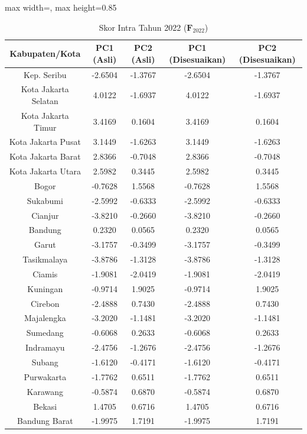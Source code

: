 \begin{table}[H]
\centering
\caption{Skor Intra Tahun 2022 ($\mathbf{F}_{2022}$)} \label{tab:appskor_intra_2022}
\begin{adjustbox}{max width=\textwidth, max height=0.85\textheight}
\begin{tabular}{|c|c|c|c|c|}
\hline
\textbf{Kabupaten/Kota} & \textbf{PC1 (Asli)} & \textbf{PC2 (Asli)} & \textbf{PC1 (Disesuaikan)} & \textbf{PC2 (Disesuaikan)} \\
\hline
Kep. Seribu & -2.6504 & -1.3767 & -2.6504 & -1.3767 \\
Kota Jakarta Selatan & 4.0122 & -1.6937 & 4.0122 & -1.6937 \\
Kota Jakarta Timur & 3.4169 & 0.1604 & 3.4169 & 0.1604 \\
Kota Jakarta Pusat & 3.1449 & -1.6263 & 3.1449 & -1.6263 \\
Kota Jakarta Barat & 2.8366 & -0.7048 & 2.8366 & -0.7048 \\
Kota Jakarta Utara & 2.5982 & 0.3445 & 2.5982 & 0.3445 \\
Bogor & -0.7628 & 1.5568 & -0.7628 & 1.5568 \\
Sukabumi & -2.5992 & -0.6333 & -2.5992 & -0.6333 \\
Cianjur & -3.8210 & -0.2660 & -3.8210 & -0.2660 \\
Bandung & 0.2320 & 0.0565 & 0.2320 & 0.0565 \\
Garut & -3.1757 & -0.3499 & -3.1757 & -0.3499 \\
Tasikmalaya & -3.8786 & -1.3128 & -3.8786 & -1.3128 \\
Ciamis & -1.9081 & -2.0419 & -1.9081 & -2.0419 \\
Kuningan & -0.9714 & 1.9025 & -0.9714 & 1.9025 \\
Cirebon & -2.4888 & 0.7430 & -2.4888 & 0.7430 \\
Majalengka & -3.2020 & -1.1481 & -3.2020 & -1.1481 \\
Sumedang & -0.6068 & 0.2633 & -0.6068 & 0.2633 \\
Indramayu & -2.4756 & -1.2676 & -2.4756 & -1.2676 \\
Subang & -1.6120 & -0.4171 & -1.6120 & -0.4171 \\
Purwakarta & -1.7762 & 0.6511 & -1.7762 & 0.6511 \\
Karawang & -0.5874 & 0.6870 & -0.5874 & 0.6870 \\
Bekasi & 1.4705 & 0.6716 & 1.4705 & 0.6716 \\
Bandung Barat & -1.9975 & 1.7191 & -1.9975 & 1.7191 \\

\end{tabular}
\end{adjustbox}
\end{table}
